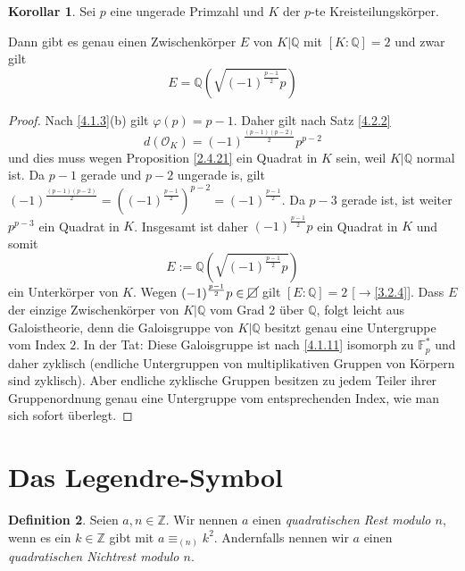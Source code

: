 \documentclass[
twoside=semi,
fontsize=12,
DIV=12, 
cleardoublepage=current,
leqno,
headings=optiontoheadandtoc, 
toc=idx
]{scrbook}
\newcommand{\Z}{\mathbb{Z}}
\newcommand{\Q}{\mathbb{Q}}
\newcommand{\F}{\mathbb{F}}
\newcommand{\nsquare}{\cancel{\square}}
\newcommand{\brac}[1]{\left( #1 \right)}
\theoremstyle{definition}
\newtheorem{definition}{Definition}[section]
\newtheorem{korollar}[definition]{Korollar}
\begin{document}
 	\begin{korollar}\label{4.2.3}\hfill\newline
 		Sei $p$ eine ungerade Primzahl und $K$ der $p$-te Kreisteilungsk\"orper. 
 		
 		\medskip\noindent
 		Dann gibt es genau einen Zwischenk\"orper $E$ von $K|\Q$ mit $[K:\Q] = 2$ und zwar gilt 
 			\[E=\Q\brac{\sqrt{(-1)^{\frac{p-1}{2}} p}}\]
 		
 		\begin{proof}
 			Nach \ref{4.1.3}(b) gilt $\varphi(p) = p - 1$. Daher gilt nach Satz \ref{4.2.2}
 				\[d(\mathcal{O}_K) = (-1)^{\frac{(p-1)(p-2)}{2}}p^{p-2} \]
 			und dies muss wegen Proposition \ref{2.4.21} ein Quadrat in $K$ sein, weil $K|\Q$ normal ist. Da $p-1$ gerade und $p-2$ ungerade is, gilt $(-1)^{\frac{(p-1)(p-2)}{2}} = ((-1)^{\frac{p-1}{2}})^{p-2} = (-1)^{\frac{p-1}{2}}$. Da $p-3$ gerade ist, ist weiter $p^{p-3}$ ein Quadrat in $K$. Insgesamt ist daher $(-1)^{\frac{p-1}{2}}p$ ein Quadrat in $K$ und somit 
 				\[E:= \Q\brac{\sqrt{(-1)^{\frac{p-1}{2}}p }}\]
 			ein Unterk\"orper von $K$. Wegen $(-1)^{\frac{p-1}{2}}p \in \nsquare$ gilt $[E:\Q] = 2$ [$\to$\ref{3.2.4}]. Dass $E$ der einzige Zwischenk\"orper von $K|\Q$ vom Grad $2$ \"uber $\Q$, folgt 
 			leicht aus Galoistheorie, denn die Galoisgruppe von $K|\Q$ besitzt genau eine Untergruppe vom Index $2$. In der Tat: Diese Galoisgruppe ist  nach \ref{4.1.11} isomorph zu $\F_p^*$ und daher 
 			zyklisch (endliche Untergruppen von multiplikativen Gruppen von K\"orpern sind zyklisch). Aber endliche zyklische Gruppen besitzen zu jedem Teiler ihrer Gruppenordnung genau eine Untergruppe vom entsprechenden Index, wie man sich sofort \"uberlegt.
 		\end{proof}
 	\end{korollar}
 
 
 	
 	\newpage
 	\section{Das Legendre-Symbol}\thispagestyle{sectionstart}
 	
 	\begin{definition}\label{4.3.1}\hfill\newline
 		Seien $a, n \in \Z$. Wir nennen $a$ einen \emph{quadratischen Rest modulo $n$}, wenn es ein $k \in \Z$ gibt mit 
 		$a \equiv_{(n)} k^2$. Andernfalls nennen wir $a$ einen \emph{quadratischen Nichtrest modulo $n$}.
 	\end{definition}
 
\end{document}
